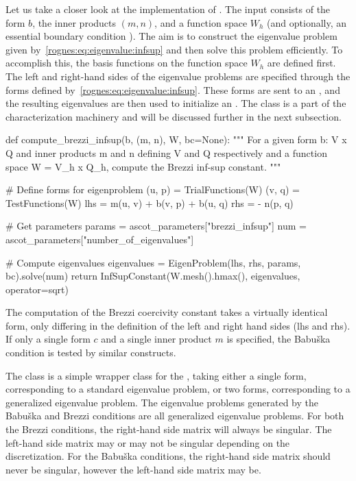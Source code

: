 Let us take a closer look at the implementation
of . The input consists of
the form $b$, the inner products $(m, n)$, and a function space $W_h$
(and optionally, an essential boundary
condition ). The aim is to construct the
eigenvalue problem given by~\eqref{rognes:eq:eigenvalue:infsup} and
then solve this problem efficiently. To accomplish this, the basis
functions on the function space $W_h$ are defined first. The left and
right-hand sides of the eigenvalue problems are specified through the
forms defined by~\eqref{rognes:eq:eigenvalue:infsup}. These forms are
sent to an
, and the resulting eigenvalues are then
used to initialize an . The
 class is a part of the
characterization machinery and will be discussed further in the next
subsection.
\begin{python}
def compute_brezzi_infsup(b, (m, n), W, bc=None):
    """
    For a given form b: V x Q \rightarrow \R and inner products m and
    n defining V and Q respectively and a function space W = V_h x
    Q_h, compute the Brezzi inf-sup constant.
    """

    # Define forms for eigenproblem
    (u, p) = TrialFunctions(W)
    (v, q) = TestFunctions(W)
    lhs = m(u, v) + b(v, p) + b(u, q)
    rhs = - n(p, q)

    # Get parameters
    params = ascot_parameters["brezzi_infsup"]
    num = ascot_parameters["number_of_eigenvalues"]

    # Compute eigenvalues
    eigenvalues = EigenProblem(lhs, rhs, params, bc).solve(num)
    return InfSupConstant(W.mesh().hmax(), eigenvalues, operator=sqrt)
\end{python}
The computation of the Brezzi coercivity constant takes a
virtually identical form, only differing in the definition of the left
and right hand sides (lhs and rhs). If only a single form $c$ and a
single inner product $m$ is specified, the Babu\v ska condition is
tested by similar constructs.

The  class is a simple wrapper class for the
\dolfin{} , taking either a single form,
corresponding to a standard eigenvalue problem, or two forms,
corresponding to a generalized eigenvalue problem. The eigenvalue
problems generated by the Babu\v ska and Brezzi conditions are all
generalized eigenvalue problems. For both the Brezzi conditions, the
right-hand side matrix will always be singular. The left-hand side
matrix may or may not be singular depending on the discretization. For
the Babu\v ska conditions, the right-hand side matrix should never be
singular, however the left-hand side matrix may be.

